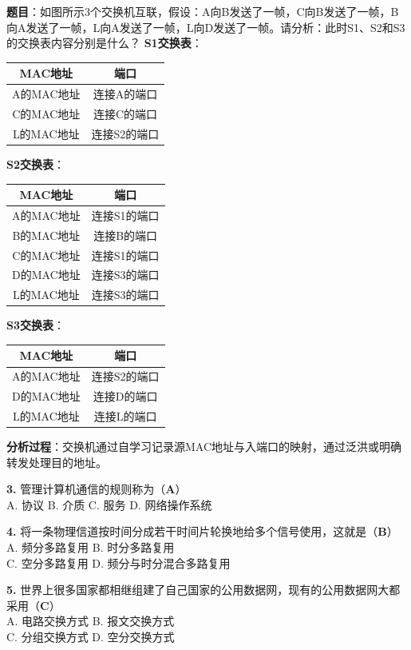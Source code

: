 \begin{examplebox}
\textbf{题目}：如图所示3个交换机互联，假设：A向B发送了一帧，C向B发送了一帧，B向A发送了一帧，L向A发送了一帧，L向D发送了一帧。请分析：此时S1、S2和S3的交换表内容分别是什么？
\tcblower
\textbf{S1交换表}：
\begin{center}\small
\begin{tabular}{|c|c|}
\hline
MAC地址 & 端口 \\
\hline
A的MAC地址 & 连接A的端口 \\
C的MAC地址 & 连接C的端口 \\
L的MAC地址 & 连接S2的端口 \\
\hline
\end{tabular}
\end{center}

\textbf{S2交换表}：
\begin{center}\small
\begin{tabular}{|c|c|}
\hline
MAC地址 & 端口 \\
\hline
A的MAC地址 & 连接S1的端口 \\
B的MAC地址 & 连接B的端口 \\
C的MAC地址 & 连接S1的端口 \\
D的MAC地址 & 连接S3的端口 \\
L的MAC地址 & 连接S3的端口 \\
\hline
\end{tabular}
\end{center}

\textbf{S3交换表}：
\begin{center}\small
\begin{tabular}{|c|c|}
\hline
MAC地址 & 端口 \\
\hline
A的MAC地址 & 连接S2的端口 \\
D的MAC地址 & 连接D的端口 \\
L的MAC地址 & 连接L的端口 \\
\hline
\end{tabular}
\end{center}

\textbf{分析过程}：交换机通过自学习记录源MAC地址与入端口的映射，通过泛洪或明确转发处理目的地址。
\end{examplebox}

\begin{examplebox}[选择题（补充）]
\textbf{3.} 管理计算机通信的规则称为（\textbf{A}）\\
A. 协议 \quad B. 介质 \quad C. 服务 \quad D. 网络操作系统

\textbf{4.} 将一条物理信道按时间分成若干时间片轮换地给多个信号使用，这就是（\textbf{B}）\\
A. 频分多路复用 \quad B. 时分多路复用\\
C. 空分多路复用 \quad D. 频分与时分混合多路复用

\textbf{5.} 世界上很多国家都相继组建了自己国家的公用数据网，现有的公用数据网大都采用（\textbf{C}）\\
A. 电路交换方式 \quad B. 报文交换方式\\
C. 分组交换方式 \quad D. 空分交换方式
\end{examplebox}

